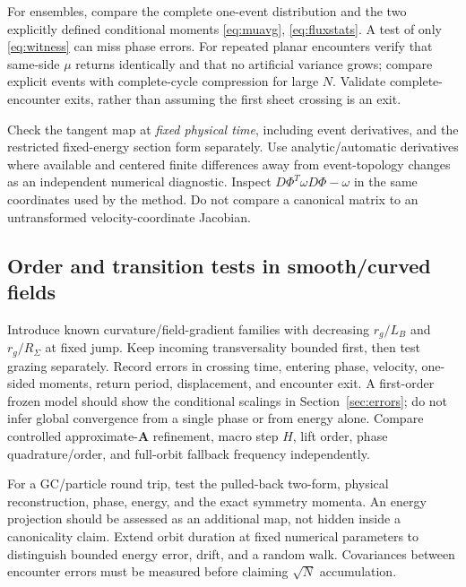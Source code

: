 \documentclass[10pt,a4paper]{article}
\newcommand{\A}{\mathbf A}\newcommand{\dd}{\mathrm d}
\begin{document}
For ensembles, compare the complete one-event distribution and the two explicitly defined conditional moments \eqref{eq:muavg}, \eqref{eq:fluxstats}. A test of only \eqref{eq:witness} can miss phase errors. For repeated planar encounters verify that same-side $\mu$ returns identically and that no artificial variance grows; compare explicit events with complete-cycle compression for large $N$. Validate complete-encounter exits, rather than assuming the first sheet crossing is an exit.

Check the tangent map at \emph{fixed physical time}, including event derivatives, and the restricted fixed-energy section form separately. Use analytic/automatic derivatives where available and centered finite differences away from event-topology changes as an independent numerical diagnostic. Inspect $D\Phi^T\omega D\Phi-\omega$ in the same coordinates used by the method. Do not compare a canonical matrix to an untransformed velocity-coordinate Jacobian.

\subsection{Order and transition tests in smooth/curved fields}
Introduce known curvature/field-gradient families with decreasing $r_g/L_B$ and $r_g/R_\Sigma$ at fixed jump. Keep incoming transversality bounded first, then test grazing separately. Record errors in crossing time, entering phase, velocity, one-sided moments, return period, displacement, and encounter exit. A first-order frozen model should show the conditional scalings in Section~\ref{sec:errors}; do not infer global convergence from a single phase or from energy alone. Compare controlled approximate-$\A$ refinement, macro step $H$, lift order, phase quadrature/order, and full-orbit fallback frequency independently.

For a GC/particle round trip, test the pulled-back two-form, physical reconstruction, phase, energy, and the exact symmetry momenta. An energy projection should be assessed as an additional map, not hidden inside a canonicality claim. Extend orbit duration at fixed numerical parameters to distinguish bounded energy error, drift, and a random walk. Covariances between encounter errors must be measured before claiming $\sqrt N$ accumulation.
\end{document}
